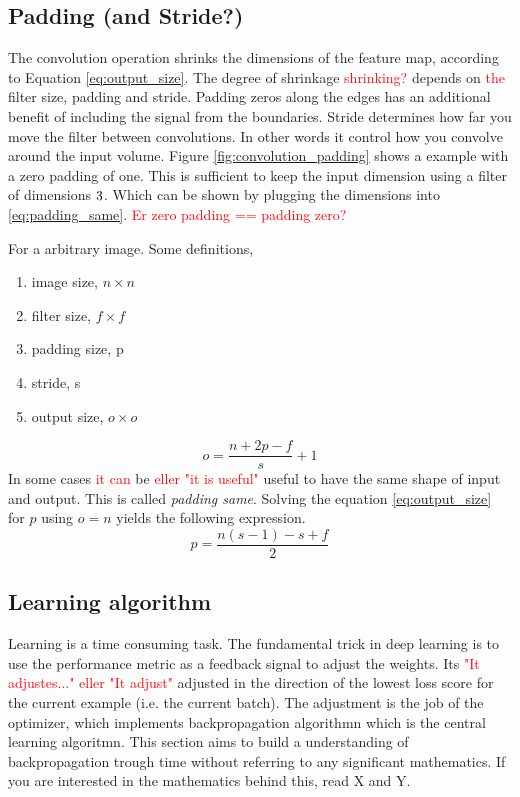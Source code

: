 \documentclass{article}
\begin{document}
\subsection{Padding (and Stride?)} \label{sec:padding}
The convolution operation shrinks the dimensions of the feature map, according to Equation \eqref{eq:output_size}. The degree of shrinkage \textcolor{red}{shrinking?} depends on \textcolor{red}{the} filter size, padding and stride. Padding zeros along the edges has an additional benefit of including the signal from the boundaries. Stride determines how far you move the filter between convolutions. In other words it control how you convolve around the input volume. Figure \ref{fig:convolution_padding} shows a example with a zero padding of one. This is sufficient to keep the input dimension using a filter of dimensions $3 \time 3$. Which can be shown by plugging the dimensions into \eqref{eq:padding_same}.
\textcolor{red}{Er zero padding == padding zero?}

For a arbitrary image. Some definitions,
\begin{enumerate}
    \item image size, $n\times n$
    \item filter size, $f\times f$
    \item padding size, p
    \item stride, s
    \item output size, $o \times o$
\end{enumerate}

\begin{equation} \label{eq:output_size}
    o = \frac{n+2p-f}{s} + 1
\end{equation}
In some cases \textcolor{red}{it can} be \textcolor{red}{eller "it is useful"} useful to have the same shape of input and output. This is called \textit{padding same}. Solving the equation \eqref{eq:output_size} for $p$ using $o=n$ yields the following expression.
\begin{equation} \label{eq:padding_same}
    p = \frac{n\left(s-1\right)-s+f}{2}
\end{equation}

\subsection{Learning algorithm} \label{sec:backprop_learning_algorithm}
Learning is a time consuming task. The fundamental trick in deep learning is to use the performance metric as a feedback signal to adjust the weights. Its \textcolor{red}{"It adjustes..." eller "It adjust"} adjusted in the direction of the lowest loss score for the current example (i.e. the current batch). The adjustment is the job of the optimizer, which implements backpropagation algorithmn which is the central learning algoritmn. This section aims to build a understanding of backpropagation trough time without referring to any significant mathematics. If you are interested in the mathematics behind this, read X and Y. 
\end{document}
